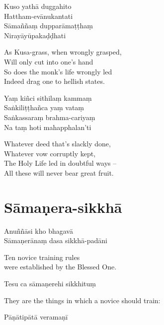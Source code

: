 Kuso yathā duggahito\\
Hattham-evānukantati\\
Sāmaññaṃ dupparāmaṭṭhaṃ\\
Nirayāyūpakaḍḍhati

\begin{english}
  As Kusa-grass, when wrongly grasped,\\
  Will only cut into one's hand\\
  So does the monk's life wrongly led\\
  Indeed drag one to hellish states.
\end{english}

Yaṃ kiñci sithilaṃ kammaṃ\\
Saṅkiliṭṭhañca yaṃ vataṃ\\
Saṅkassaraṃ brahma-cariyaṃ\\
Na taṃ hoti mahapphalan'ti

\ifreferenceedition
\clearpage
\fi

\begin{english}
  Whatever deed that's slackly done,\\
  Whatever vow corruptly kept,\\
  The Holy Life led in doubtful ways --\\
  All these will never bear great fruit. 
\end{english}

\ifhandbookedition
\clearpage
\fi

\section{Sāmaṇera-sikkhā}


Anuññāsi kho bhagavā\\
Sāmaṇerānaṃ dasa sikkhā-padāni

\begin{cprenglish}
  Ten novice training rules\\
  were established by the Blessed One.
\end{cprenglish}

Tesu ca sāmaṇerehi sikkhituṃ

\begin{cprenglish}
  They are the things in which a novice should train:
\end{cprenglish}

Pāṇātipātā veramaṇī

